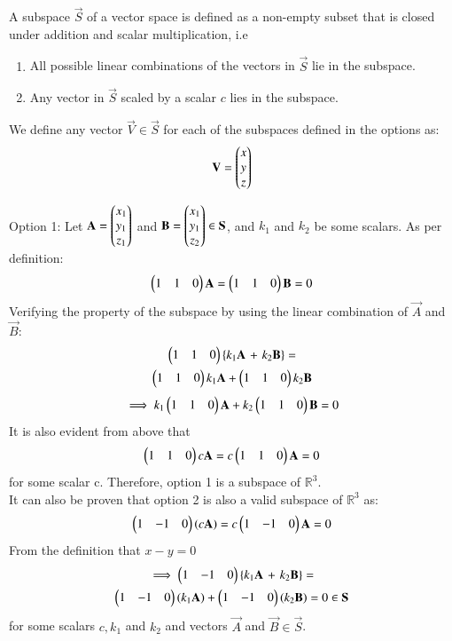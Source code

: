 A subspace $\vec{S}$ of a vector space is defined as a non-empty subset that is closed under addition and scalar multiplication, i.e
\begin{enumerate}
  \item All possible linear combinations of the vectors in $\vec{S}$ lie in the subspace.
  \item Any vector in $\vec{S}$ scaled by a scalar $c$ lies in the subspace.
\end{enumerate}
We define any vector $\vec{V} \in \vec{S}$ for each of the subspaces defined in the options as:
\begin{align}
  \mathbf{V} = \begin{pmatrix}x \\ y \\ z\end{pmatrix}
\end{align}

{Option 1:}
Let $\mathbf{A} = \begin{pmatrix}x_1 \\ y_1 \\ z_1\end{pmatrix}$ and $\mathbf{B} = \begin{pmatrix}x_1 \\ y_1 \\ z_2\end{pmatrix} \in \mathbf{S}$, and $k_1$ and $k_2$ be some scalars. As per definition:
\begin{align}
  \begin{pmatrix}1 & 1 & 0\end{pmatrix}\mathbf{A} = \begin{pmatrix}1 & 1 & 0\end{pmatrix}\mathbf{B} = 0
\end{align}
Verifying the property of the subspace by using the linear combination of $\vec{A}$ and $\vec{B}$:
\begin{multline}
    \begin{pmatrix}1 & 1 & 0\end{pmatrix}\left\{k_1\mathbf{A}\right. + \left.k_2\mathbf{B}\right\} = \\ \begin{pmatrix}1 & 1 & 0\end{pmatrix}k_1\mathbf{A} + \begin{pmatrix}1 & 1 & 0\end{pmatrix}k_2\mathbf{B}
\end{multline}
\begin{align}
  \implies  k_1\begin{pmatrix}1 & 1 & 0\end{pmatrix}\mathbf{A} + k_2\begin{pmatrix}1 & 1 & 0\end{pmatrix}\mathbf{B} = 0
\end{align}
It is also evident from above that
\begin{align}
  \begin{pmatrix}1 & 1 & 0\end{pmatrix}c\mathbf{A} = c\begin{pmatrix}1 & 1 & 0\end{pmatrix}\mathbf{A} = 0
\end{align}
for some scalar c. Therefore, option 1 is a subspace of $\mathbb{R}^3$. \\
It can also be proven that option 2 is also a valid subspace of $\mathbb{R}^3$ as:
\begin{align}
  \begin{pmatrix}1 & -1 & 0\end{pmatrix}(c\mathbf{A}) = c\begin{pmatrix}1 & -1 & 0\end{pmatrix}\mathbf{A} = 0
\end{align}
From the definition that $x-y = 0$
\begin{multline}
    \implies \begin{pmatrix}1 & -1 & 0\end{pmatrix}\left\{k_1\mathbf{A}\right. + \left.k_2\mathbf{B}\right\} = \\
    \begin{pmatrix}1 & -1 & 0\end{pmatrix}(k_1\mathbf{A}) + \begin{pmatrix}1 & -1 & 0\end{pmatrix}(k_2\mathbf{B}) = 0\in \mathbf{S}
\end{multline} for some scalars $c, k_1$ and $k_2$ and vectors $\vec{A}$ and $\vec{B} \in \vec{S}$.
